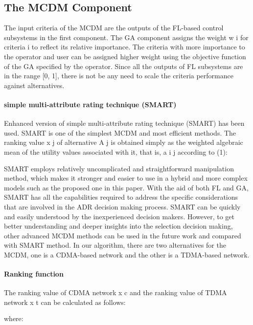 \subsection{The MCDM Component}

The input criteria of the MCDM are the outputs of the FL-based control subsystems in the first component.
The GA component assigns the weight w i for criteria i to reflect its relative importance.
The criteria with more importance to the operator and user can be assigned higher weight using the objective function of the GA specified by the operator.
Since all the outputs of FL subsystems are in the range [0, 1],
	there is not be any need to scale the criteria performance against alternatives.

\paragraph{simple multi-attribute rating technique (SMART)}

Enhanced version of simple multi-attribute rating technique (SMART) has been used.
SMART is one of the simplest MCDM and most efficient methods.
The ranking value x j of alternative A j is obtained simply as the weighted algebraic mean of the utility values associated with it,
	that is,
	a i j according to (1):

SMART employs relatively uncomplicated and straightforward manipulation method,
	which makes it stronger and easier to use in a hybrid and more complex models such as the proposed one in this paper.
With the aid of both FL and GA,
	SMART has all the capabilities required to address the specific considerations that are involved in the \ac{ADR} decision making process.
SMART can be quickly and easily understood by the inexperienced decision makers.
However,
	to get better understanding and deeper insights into the selection decision making,
	other advanced MCDM methods can be used in the future work and compared with SMART method.
In our algorithm,
	there are two alternatives for the MCDM,
	one is a CDMA-based network and the other is a TDMA-based network.

\paragraph*{Ranking function}
The ranking value of CDMA network x c and the ranking value of TDMA network x t can be calculated as follows:

where:

